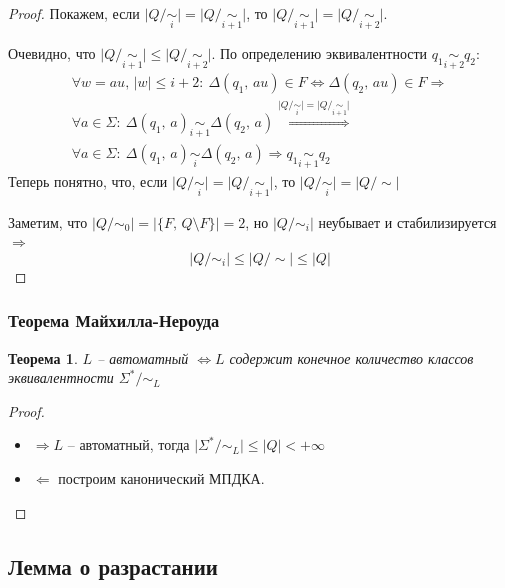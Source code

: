 \documentclass[a4paper,12pt]{article}
\renewcommand{\leq}{\ensuremath{\leqslant}}
\theoremstyle{plain}
\newtheorem{theorem}{Теорема}[subsection]
\theoremstyle{definition}
\theoremstyle{remark}
\begin{document}
\begin{proof}
	Покажем, если $\vert Q / \underset{i}{\sim}\vert = \vert Q / \underset{i + 1}{\sim}\vert$, то $\vert Q / \underset{i + 1}{\sim}\vert = \vert Q / \underset{i + 2}{\sim}\vert$.

	Очевидно, что $\vert Q / \underset{i + 1}{\sim}\vert \leq \vert Q / \underset{i + 2}{\sim}\vert$. По определению эквивалентности $q_1 \underset{i + 2}{\sim} q_2$:
	\begin{align*}
		\forall w = au,\, \vert w \vert \leq i + 2 :\: \Delta(q_1,\, au) \in F \Leftrightarrow \Delta(q_2,\,au) \in F \Rightarrow                                                          \\
		\forall a \in \Sigma :\: \Delta(q_1,\, a) \underset{i + 1}{\sim} \Delta(q_2,\, a) \overset{\vert Q / \underset{i}{\sim}\vert = \vert Q / \underset{i + 1}{\sim}\vert}{\Rightarrow} \\
		\forall a \in \Sigma :\: \Delta(q_1,\, a) \underset{i}{\sim} \Delta(q_2,\,a) \Rightarrow q_1 \underset{i + 1}{\sim} q_2
	\end{align*}
	Теперь понятно, что, если $\vert Q / \underset{i}{\sim}\vert = \vert Q / \underset{i + 1}{\sim}\vert$, то $\vert Q / \underset{i}{\sim}\vert = \vert Q / \sim \vert$

	Заметим, что $\vert Q / \sim_0\vert = \vert\{F,\, Q \setminus F\}\vert = 2$, но $\vert Q / \sim_i\vert$ неубывает и стабилизируется $\Rightarrow$
	\[
		\vert Q / \sim_i\vert \leq \vert Q / \sim\vert \leq \vert Q\vert
	\]
\end{proof}

\subsubsection*{Теорема Майхилла-Нероуда}
\begin{theorem}
	$L$ -- автоматный $\Leftrightarrow L$ содержит конечное количество классов эквивалентности $\Sigma^* / \sim_L$
\end{theorem}

\begin{proof}
	\begin{itemize}
		\item $\Rightarrow L$ -- автоматный, тогда $\vert\Sigma^* /\sim_L\vert \leq \vert Q \vert < +\infty$
		\item $\Leftarrow$ построим канонический МПДКА.
	\end{itemize}
\end{proof}

\subsection{Лемма о разрастании}
\end{document}
